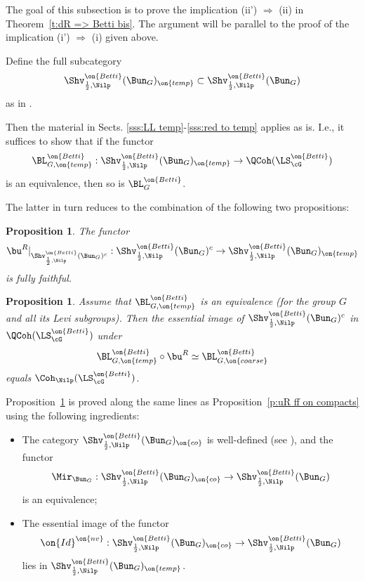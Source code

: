 \documentclass[9pt]{amsart}
\newtheorem{prop}[subsubsection]{Proposition}
\theoremstyle{remark}
\theoremstyle{definition}
\theoremstyle{remark}
\newcommand{\thmref}[1]{Theorem~\ref{#1}}
\newcommand{\propref}[1]{Proposition~\ref{#1}}
\numberwithin{equation}{section}
\begin{document}

The goal of this subsection is to prove the implication (ii') $\Rightarrow$ (ii) 
in \thmref{t:dR => Betti bis}. The argument will be parallel to the proof of 
the implication (i') $\Rightarrow$ (i) given above. 

\sssec{}

Define the full subcategory
$$\Shv^{\on{Betti}}_{\frac{1}{2},\Nilp}(\Bun_G)_{\on{temp}}\subset \Shv^{\on{Betti}}_{\frac{1}{2},\Nilp}(\Bun_G)$$
as in \cite[Sect. 12.8.4]{AG}. 

\medskip

Then the material in Sects. \ref{sss:LL temp}-\ref{sss:red to temp} applies as is. I.e., it suffices to show that
if the functor
$$\BL^{\on{Betti}}_{G,\on{temp}}:\Shv^{\on{Betti}}_{\frac{1}{2},\Nilp}(\Bun_G)_{\on{temp}}\to \QCoh(\LS^{\on{Betti}}_\cG)$$
is an equivalence, then so is $\BL^{\on{Betti}}_G$. 

\medskip

The latter in turn reduces to the combination of the following two propositions:

\begin{prop} \label{p:uR ff on compacts Betti}
The functor 
$$\bu^R|_{\Shv^{\on{Betti}}_{\frac{1}{2},\Nilp}(\Bun_G)^c}:\Shv^{\on{Betti}}_{\frac{1}{2},\Nilp}(\Bun_G)^c\to 
\Shv^{\on{Betti}}_{\frac{1}{2},\Nilp}(\Bun_G)_{\on{temp}}$$
is fully faithful.
\end{prop}

\begin{prop} \label{p:images Betti}
Assume that $\BL^{\on{Betti}}_{G,\on{temp}}$ is an equivalence (for the group $G$ and all its Levi subgroups). 
Then the essential image of $\Shv^{\on{Betti}}_{\frac{1}{2},\Nilp}(\Bun_G)^c$ in $\QCoh(\LS^{\on{Betti}}_\cG)$
under 
$$\BL^{\on{Betti}}_{G,\on{temp}}\circ \bu^R\simeq \BL^{\on{Betti}}_{G,\on{coarse}}$$ 
equals $\Coh_\Nilp(\LS^{\on{Betti}}_\cG)$.
\end{prop}

\sssec{}

\propref{p:uR ff on compacts Betti} is proved along the same lines as \propref{p:uR ff on compacts}
using the following ingredients:

\begin{itemize}

\item The category $\Shv^{\on{Betti}}_{\frac{1}{2},\Nilp}(\Bun_G)_{\on{co}}$ is well-defined
(see \cite[Theorem 14.1.5]{AGKRRV}), and the functor 
$$\Mir_{\Bun_G}:\Shv^{\on{Betti}}_{\frac{1}{2},\Nilp}(\Bun_G)_{\on{co}}\to
\Shv^{\on{Betti}}_{\frac{1}{2},\Nilp}(\Bun_G)$$
is an equivalence;

\smallskip

\item The essential image of the functor
$$\on{Id}^{\on{nv}}:\Shv^{\on{Betti}}_{\frac{1}{2},\Nilp}(\Bun_G)_{\on{co}}\to
\Shv^{\on{Betti}}_{\frac{1}{2},\Nilp}(\Bun_G)$$
lies in $\Shv^{\on{Betti}}_{\frac{1}{2},\Nilp}(\Bun_G)_{\on{temp}}$.

\end{itemize}
\end{document}
